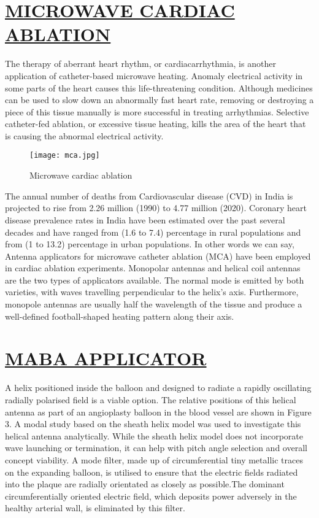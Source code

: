 \documentclass[12pts]{article}
\begin{document}
\section*{\underline{MICROWAVE CARDIAC ABLATION}}

\begin{flushleft}
\begin{large}
The therapy of aberrant heart rhythm, or cardiacarrhythmia, is another application of catheter-based microwave heating. Anomaly electrical activity in some parts of the heart causes this life-threatening condition. Although medicines can be used to slow down an abnormally fast heart rate, removing or destroying a piece of this tissue manually is more successful in treating arrhythmias. Selective catheter-fed ablation, or excessive tissue heating, kills the area of the heart that is causing the abnormal electrical activity.

\begin{figure}[h]
\centering
\texttt{[image: mca.jpg]}
\caption{Microwave cardiac ablation}
\end{figure}

The annual number of deaths from Cardiovascular disease (CVD) in India is projected to rise from 2.26 million (1990) to 4.77 million (2020). Coronary heart disease prevalence rates in India have been estimated over the past several decades and have ranged from (1.6 to 7.4) percentage in rural populations and from (1 to 13.2) percentage in urban populations.
In other words we can say, Antenna applicators for microwave catheter ablation (MCA) have been employed in cardiac ablation experiments. Monopolar antennas and helical coil antennas are the two types of applicators available. The normal mode is emitted by both varieties, with waves travelling perpendicular to the helix's axis. Furthermore, monopole antennas are usually half the wavelength of the tissue and produce a well-defined football-shaped heating pattern along their axis.
\end{large}
\end{flushleft}
\section*{\underline{MABA APPLICATOR}}
\begin{large}
A helix positioned inside the balloon and designed to radiate a rapidly oscillating radially polarised field is a viable option. The relative positions of this helical antenna as part of an angioplasty balloon in the blood vessel are shown in Figure 3. A modal study based on the sheath helix model was used to investigate this helical antenna analytically. While the sheath helix model does not incorporate wave launching or termination, it can help with pitch angle selection and overall concept viability. A mode filter, made up of circumferential tiny metallic traces on the expanding balloon, is utilised to ensure that the electric fields radiated into the plaque are radially orientated as closely as possible.The dominant circumferentially oriented electric field, which deposits power adversely in the healthy arterial wall, is eliminated by this filter.
\end{large}
\end{document}
